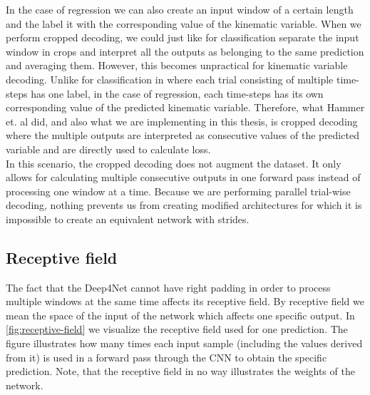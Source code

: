 In the case of regression we can also create an input window of a certain length and the label it with the corresponding value of the kinematic variable.
When we perform cropped decoding, we could just like for classification separate the input window in crops and interpret all the outputs as belonging to the same prediction and averaging them.
However, this becomes unpractical for kinematic variable decoding.
Unlike for classification in \cite{schirrmeister-deep-2017} where each trial consisting of multiple time-steps has one label, in the case of regression, each time-steps has its own corresponding value of the predicted kinematic variable. 
Therefore, what Hammer et. al \cite{Hammer-2021} did, and also what we are implementing in this thesis, is cropped decoding where the multiple outputs are interpreted as consecutive values of the predicted variable and are directly used to calculate loss. \\

In this scenario, the cropped decoding does not augment the dataset. 
It only allows for calculating multiple consecutive outputs in one forward pass instead of processing one window at a time. 
Because we are performing parallel trial-wise decoding, nothing prevents us from creating modified architectures for which it is impossible to create an equivalent network with strides. \\

\subsection{Receptive field}\label{subsec:receptive-field}
The fact that the Deep4Net cannot have right padding in order to process multiple windows at the same time affects its receptive field.
By receptive field we mean the space of the input of the network which affects one specific output.
In \cref{fig:receptive-field} we visualize the receptive field used for one prediction.
The figure illustrates how many times each input sample (including the values derived from it) is used in a forward pass through the CNN to obtain the specific prediction.
Note, that the receptive field in no way illustrates the weights of the network.

